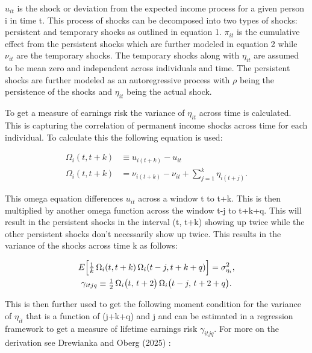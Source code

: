 \documentclass[12pt]{article}
\begin{document}
\begin{onehalfspace}
\vspace{-0.25cm}

$u_{it}$ is the shock or deviation from the expected income process for a given person i in time t. This process of shocks can be decomposed into two types of shocks: persistent and temporary shocks as outlined in equation 1. $\pi_{it}$ is the cumulative effect from the persistent shocks which are further modeled in equation 2 while $\nu_{it}$ are the temporary shocks. The temporary shocks along with $\eta_{it}$ are assumed to be mean zero and independent across individuals and time. The persistent shocks are further modeled as an autoregressive process with $\rho$ being the persistence of the shocks and $\eta_{it}$ being the actual shock.

To get a measure of earnings risk the variance of $\eta_{it}$ across time is calculated. This is capturing the correlation of permanent income shocks across time for each individual. To calculate this the following equation is used:

\vspace{-0.75cm}

\begin{align}
\Omega_i(t,t+k)
&\equiv u_{i(t+k)} - u_{it}\\[1ex]
\Omega_i(t,t+k)
&= \nu_{i(t+k)} - \nu_{it}
  + \sum_{j=1}^k \eta_{i(t+j)}.
\end{align}

\vspace{-0.25cm}

This omega equation differences $u_{it}$ across a window t to t+k. This is then multiplied by another omega function across the window t-j to t+k+q. This will result in the persistent shocks in the interval (t, t+k) showing up twice while the other persistent shocks don't necessarily show up twice. This results in the variance of the shocks across time k as follows:

\vspace{-0.5cm}

\begin{gather}
E\Bigl[\tfrac{1}{k}\,\Omega_i(t,t+k)\,\Omega_i(t-j,t+k+q)\Bigr]
= \sigma^2_{\eta_i},\\
\gamma_{itjq}
\equiv \tfrac12\,\Omega_i\bigl(t,\,t+2\bigr)\,\Omega_i\bigl(t - j,\,t + 2 + q\bigr).
\end{gather}

This is then further used to get the following moment condition for the variance of $\eta_{it}$ that is a function of (j+k+q) and j and can be estimated in a regression framework to get a measure of lifetime earnings risk $\gamma_{itjq}$. For more on the derivation see Drewianka and Oberg (2025) \cite{drewianka2025}:


\end{onehalfspace}
\end{document}
